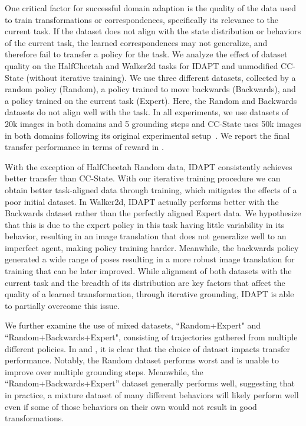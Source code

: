 One critical factor for successful domain adaption is the quality of the data used to train transformations or correspondences, specifically its relevance to the current task.  If the dataset does not align with the state distribution or behaviors of the current task, the learned correspondences may not generalize, and therefore fail to transfer a policy for the task.  We analyze the effect of dataset quality on the HalfCheetah and Walker2d tasks for IDAPT and unmodified CC-State (without iterative training).  We use three different datasets, collected by a random policy (Random), a policy trained to move backwards (Backwards), and a policy trained on the current task (Expert).  Here, the Random and Backwards datasets do not align well with the task.  In all experiments, we use datasets of 20k images in both domains and 5 grounding steps and CC-State uses 50k images in both domains following its original experimental setup~\citep{zhang2021learning}.  We report the final transfer performance in terms of reward in . 

With the exception of HalfCheetah Random data, IDAPT consistently achieves better transfer than CC-State.  With our iterative training procedure we can obtain better task-aligned data through training, which mitigates the effects of a poor initial dataset.  In Walker2d, IDAPT actually performs better with the Backwards dataset rather than the perfectly aligned Expert data.  We hypothesize that this is due to the expert policy in this task having little variability in its behavior, resulting in an image translation that does not generalize well to an imperfect agent, making policy training harder.  Meanwhile, the backwards policy generated a wide range of poses resulting in a more robust image translation for training that can be later improved. While alignment of both datasets with the current task and the breadth of its distribution are key factors that affect the quality of a learned transformation, through iterative grounding, IDAPT is able to partially overcome this issue.


We further examine the use of mixed datasets, ``Random+Expert" and ``Random+Backwards+Expert", consisting of trajectories gathered from multiple different policies.  In  and , it is clear that the choice of dataset impacts transfer performance. Notably, the Random dataset performs worst and is unable to improve over multiple grounding steps.  Meanwhile, the ``Random+Backwards+Expert'' dataset generally performs well, suggesting that in practice, a mixture dataset of many different behaviors will likely perform well even if some of those behaviors on their own would not result in good transformations.  


